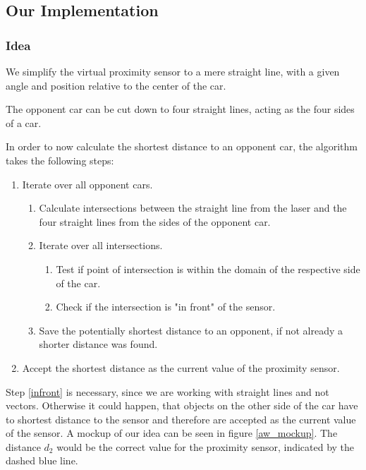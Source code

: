 \documentclass[paper=a4, fontsize=11pt]{scrreprt}
\begin{document}
\subsection{Our Implementation}
\subsubsection{Idea}
We simplify the virtual proximity sensor to a mere straight line,
with a given angle and position relative to the center of the car.

The opponent car can be cut down to four straight lines,
acting as the four sides of a car.

In order to now calculate the shortest distance to an opponent car,
the algorithm takes the following steps:

\begin{enumerate}
  \item Iterate over all opponent cars.
  \begin{enumerate}
    \item Calculate intersections between the straight line from the laser
    and the four straight lines from the sides of the opponent car.
    \item Iterate over all intersections.
    \begin{enumerate}
      \item Test if point of intersection is within the domain of the respective side of the car.
      \item\label{infront} Check if the intersection is "in front" of the sensor.
    \end{enumerate}
    \item Save the potentially shortest distance to an opponent, if not already a shorter distance was found.
  \end{enumerate}
  \item Accept the shortest distance as the current value of the proximity sensor.
\end{enumerate}

Step \ref{infront} is necessary, since we are working with straight lines
and not vectors. Otherwise it could happen,
that objects on the other side of the car have to shortest distance to the sensor
and therefore are accepted as the current value of the sensor.
A mockup of our idea can be seen in figure \ref{aw_mockup}.
The distance $d_2$ would be the correct value for the proximity sensor,
indicated by the dashed blue line.
\end{document}
